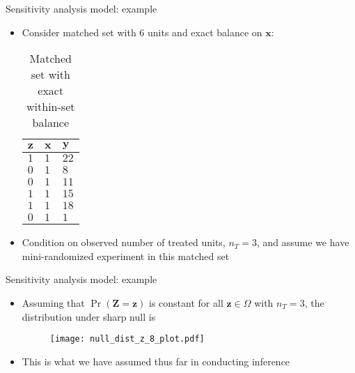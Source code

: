 \documentclass[table, xcolor={dvipsnames}, 9pt]{beamer}
\theoremstyle{newstyle}
\begin{document}
\begin{frame}{Sensitivity analysis model: example}
\vfill
\begin{itemize} \vfill
\item Consider matched set with $6$ units and exact balance on $\bm{x}$: \vfill
\begin{table}[H]
\centering{}
    \begin{tabular}{l|l|l}
   $\bm{z}$ & $\bm{x}$ & $\bm{y}$ \\ \hline
   $1$ & $1$ & $22$ \\
  $0$ & $1$ & $8$ \\
  $0$ & $1$ & $11$ \\
  $1$ & $1$ & $15$ \\
  $1$ & $1$ & $18$ \\
  $0$ & $1$ & $1$ \\
    \end{tabular}
\caption{Matched set with exact within-set balance}
\label{tab: matched set}
\end{table} \vfill
\item Condition on observed number of treated units, $n_T = 3$, and assume we have mini-randomized experiment in this matched set \vfill
\end{itemize} \vfill
\end{frame}
\begin{frame}{Sensitivity analysis model: example}
\vfill
\begin{itemize} \vfill
\item Assuming that $\Pr\left(\bm{Z} = \bm{z}\right)$ is constant for all $\bm{z} \in \Omega$ with $n_T = 3$, the distribution under sharp null is \vfill
\begin{figure}
\texttt{[image: null\_dist\_z\_8\_plot.pdf]}
\end{figure} \vfill
\item This is what we have assumed thus far in conducting inference
\end{itemize}\vfill
\end{frame}
\end{document}
